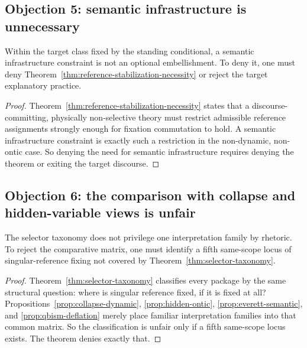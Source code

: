 \subsection{Objection 5: semantic infrastructure is unnecessary}

\begin{proposition}
\label{prop:not-adhoc}
Within the target class fixed by the standing conditional, a semantic infrastructure constraint is not an
optional embellishment. To deny it, one must deny
Theorem~\ref{thm:reference-stabilization-necessity} or reject the target explanatory practice.
\end{proposition}

\begin{proof}
Theorem~\ref{thm:reference-stabilization-necessity} states that a discourse-committing,
physically non-selective theory must restrict admissible reference assignments strongly enough for
fixation commutation to hold. A semantic infrastructure constraint is exactly such a restriction in the
non-dynamic, non-ontic case. So denying the need for semantic infrastructure requires denying the
theorem or exiting the target discourse.
\end{proof}

\subsection{Objection 6: the comparison with collapse and hidden-variable views is unfair}

\begin{proposition}
\label{prop:fair-taxonomy}
The selector taxonomy does not privilege one interpretation family by rhetoric. To reject the
comparative matrix, one must identify a fifth same-scope locus of singular-reference fixing not covered
by Theorem~\ref{thm:selector-taxonomy}.
\end{proposition}

\begin{proof}
Theorem~\ref{thm:selector-taxonomy} classifies every package by the same structural question: where
is singular reference fixed, if it is fixed at all? Propositions~\ref{prop:collapse-dynamic},
\ref{prop:hidden-ontic}, \ref{prop:everett-semantic}, and \ref{prop:qbism-deflation} merely place
familiar interpretation families into that common matrix. So the classification is unfair only if a fifth
same-scope locus exists. The theorem denies exactly that.
\end{proof}

